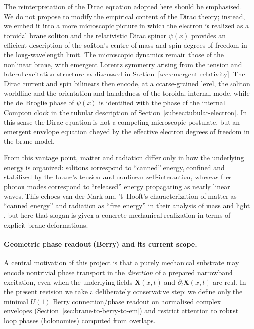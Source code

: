 The reinterpretation of the Dirac equation adopted here should be
emphasized. We do not propose to modify the empirical content of the
Dirac theory; instead, we embed it into a more microscopic picture in
which the electron is realized as a toroidal brane soliton and the
relativistic Dirac spinor $\psi(x)$ provides an efficient description
of the soliton's centre-of-mass and spin degrees of freedom in the
long-wavelength limit. The microscopic dynamics remain those of the
nonlinear brane, with emergent Lorentz symmetry arising from the
tension and lateral excitation structure as discussed in
Section~\ref{sec:emergent-relativity}. The Dirac current and spin
bilinears then encode, at a coarse-grained level, the soliton
worldline and the orientation and handedness of the toroidal internal
mode, while the de~Broglie phase of $\psi(x)$ is identified with the
phase of the internal Compton clock in the tubular description of
Section~\ref{subsec:tubular-electron}. In this sense the Dirac
equation is not a competing microscopic postulate, but an emergent
envelope equation obeyed by the effective electron degrees of freedom
in the brane model.

From this vantage point, matter and radiation differ only in how the
underlying energy is organized: solitons correspond to ``canned''
energy, confined and stabilized by the brane's tension and nonlinear
self-interaction, whereas free photon modes correspond to ``released''
energy propagating as nearly linear waves. This echoes van der Mark and
't~Hooft's characterization of matter as ``canned energy'' and radiation
as ``free energy'' in their analysis of mass and light
\cite{vanderMark2000LightHeavy}, but here that slogan is given a concrete
mechanical realization in terms of explicit brane deformations.

\paragraph{Geometric phase readout (Berry) and its current scope.}
A central motivation of this project is that a purely mechanical substrate may encode nontrivial phase
transport in the \emph{direction} of a prepared narrowband excitation, even when the underlying fields
$\mathbf X(x,t)$ and $\partial_t\mathbf X(x,t)$ are real.
In the present revision we take a deliberately conservative step: we define only the minimal $U(1)$
Berry connection/phase readout on normalized complex envelopes (Section~\ref{sec:brane-to-berry-to-em})
and restrict attention to robust loop phases (holonomies) computed from overlaps.

